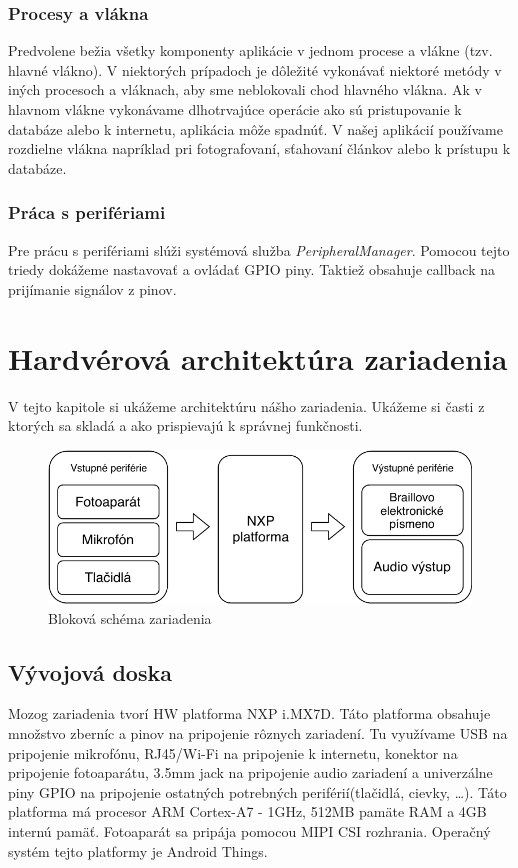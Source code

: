 \documentclass{template/socthesis}
\begin{document}
\subsection*{Procesy a vlákna}
Predvolene bežia všetky komponenty aplikácie v jednom procese a vlákne (tzv. hlavné vlákno). V niektorých prípadoch je dôležité vykonávať niektoré metódy v iných procesoch a vláknach, aby sme neblokovali chod hlavného vlákna. Ak v hlavnom vlákne vykonávame dlhotrvajúce operácie ako sú pristupovanie k databáze alebo k internetu, aplikácia môže spadnúť. V našej aplikácií používame rozdielne vlákna napríklad pri fotografovaní, sťahovaní článkov alebo k prístupu k databáze.

\subsection*{Práca s perifériami}
Pre prácu s perifériami slúži systémová služba \textit{PeripheralManager}. Pomocou tejto triedy dokážeme nastavovať a ovládať  GPIO piny. Taktiež obsahuje callback na prijímanie signálov z pinov.
\newpage

\chapter{Hardvérová architektúra zariadenia}
V tejto kapitole si ukážeme architektúru nášho zariadenia. Ukážeme si časti z ktorých sa skladá a ako prispievajú k správnej funkčnosti.

\begin{center}
	\begin{figure}[h]
		\centering
		\includegraphics{brailleblock}
		\caption{Bloková schéma zariadenia}
	\end{figure}
\end{center}

\section{Vývojová doska}
Mozog zariadenia tvorí HW platforma NXP i.MX7D. Táto platforma obsahuje množstvo zberníc a pinov na pripojenie rôznych zariadení. Tu využívame USB na pripojenie mikrofónu, RJ45/Wi-Fi na pripojenie k internetu, konektor na pripojenie fotoaparátu, 3.5mm jack na pripojenie audio zariadení a univerzálne piny GPIO na pripojenie ostatných potrebných periférií(tlačidlá, cievky, …).
Táto platforma má procesor ARM Cortex-A7 - 1GHz, 512MB pamäte RAM a 4GB internú pamäť. Fotoaparát sa pripája pomocou MIPI CSI rozhrania. Operačný systém tejto platformy je Android Things.
\end{document}
